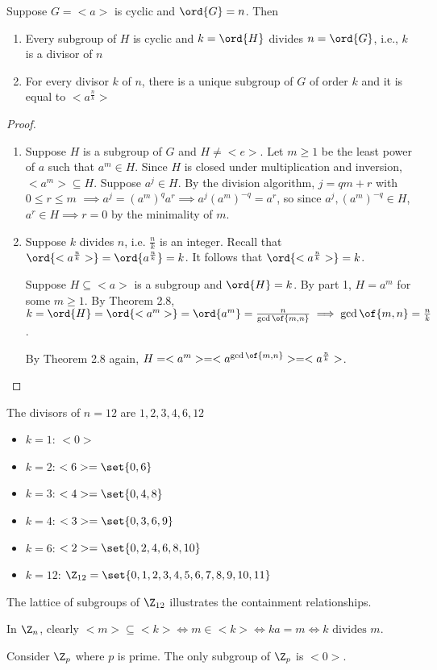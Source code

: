 \begin{theorem}
    Suppose $G = <a>$ is cyclic and $\ord{G} = n$. Then \begin{enumerate}
        \item Every subgroup of $H$ is cyclic and $k = \ord{H}$ divides $n = \ord{G}$, i.e., $k$ is a divisor of $n$
        \item For every divisor $k$ of $n$, there is a unique subgroup of $G$ of order $k$ and it is equal to $<a^{\frac{n}{k}}>$
    \end{enumerate}
\end{theorem}
\begin{proof}
    \begin{enumerate}
        \item Suppose $H$ is a subgroup of $G$ and $H \neq <e>$. Let $m \geq 1$ be the least power of $a$ such that $a^m \in H$. Since $H$ is closed under multiplication and inversion, $<a^m> \subseteq H$. Suppose $a^j \in H$. By the division algorithm, $j = qm + r$ with $0 \leq r \leq m$ $\implies a^j = \left(a^m\right)^q a^r \implies a^j \left(a^m\right)^{-q} = a^r$, so since $a^j,\left(a^m\right)^{-q} \in H$, $a^r \in H \implies r = 0$ by the minimality of $m$.
        \item Suppose $k$ divides $n$, i.e. $\frac{n}{k}$ is an integer. Recall that $\ord{<a^\frac{n}{k}>} = \ord{a^\frac{n}{k}} = k$. It follows that $\ord{<a^\frac{n}{k}>} = k$.
        
        Suppose $H \subseteq <a>$ is a subgroup and $\ord{H} = k$. By part 1, $H = a^m$ for some $m \geq 1$. By Theorem 2.8, $k = \ord{H} = \ord{<a^m>} = \ord{a^m} = \frac{n}{\gcd\of{m,n}} \implies \gcd\of{m,n} = \frac{n}{k}$.

        By Theorem 2.8 again, $H = <a^m> = <a^{\gcd\of{m,n}}> = <a^\frac{n}{k}>$.
    \end{enumerate}
\end{proof}

\newpage

\begin{example}
    The divisors of $n = 12$ are $1,2,3,4,6,12$
    \begin{itemize}
        \item $k = 1$: $<0>$
        \item $k = 2$: $<6> = \set{0,6}$
        \item $k = 3$: $<4> = \set{0,4,8}$
        \item $k = 4$: $<3> = \set{0,3,6,9}$
        \item $k = 6$: $<2> = \set{0,2,4,6,8,10}$
        \item $k = 12$: $\Z_{12} = \set{0,1,2,3,4,5,6,7,8,9,10,11}$
    \end{itemize}
    \begin{note}
        The lattice of subgroups of $\Z_{12}$ illustrates the containment relationships.
        \insertimage[0.5]
    \end{note}
\end{example}

\begin{remark}
    In $\Z_n$, clearly $<m> \subseteq <k> \iff m \in <k> \iff ka = m \iff k \text{ divides } m$.
\end{remark}

\begin{example}[subgroups of $\Z_p$]
    Consider $\Z_p$ where $p$ is prime. The only subgroup of $\Z_p$ is $<0>$.
\end{example}